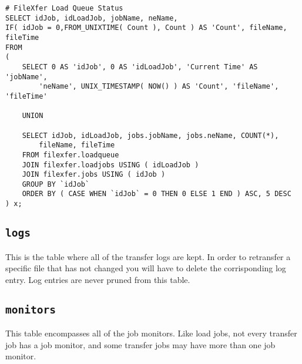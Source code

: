 \begin{verbatim}
# FileXfer Load Queue Status
SELECT idJob, idLoadJob, jobName, neName,
IF( idJob = 0,FROM_UNIXTIME( Count ), Count ) AS 'Count', fileName, fileTime
FROM 
(
	SELECT 0 AS 'idJob', 0 AS 'idLoadJob', 'Current Time' AS 'jobName',
        'neName', UNIX_TIMESTAMP( NOW() ) AS 'Count', 'fileName', 'fileTime'

	UNION

	SELECT idJob, idLoadJob, jobs.jobName, jobs.neName, COUNT(*),
        fileName, fileTime
	FROM filexfer.loadqueue 
	JOIN filexfer.loadjobs USING ( idLoadJob )
	JOIN filexfer.jobs USING ( idJob )
	GROUP BY `idJob`
	ORDER BY ( CASE WHEN `idJob` = 0 THEN 0 ELSE 1 END ) ASC, 5 DESC 
) x;
\end{verbatim}


\subsection{\texttt{logs}}
This is the table where all of the transfer logs are kept.
In order to retransfer a specific file that has not changed
you will have to delete the corrisponding log entry.  Log
entries are never pruned from this table.

\subsection{\texttt{monitors}}
This table encompasses all of the job monitors.  Like load
jobs, not every transfer job has a job monitor, and some
transfer jobs may have more than one job monitor.
